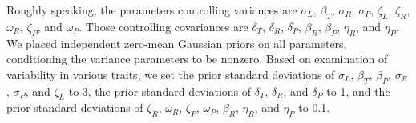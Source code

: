 \documentclass{article}
\begin{document}
Roughly speaking, the parameters controlling variances are 
$\sigma_L$, $\beta_T$, $\sigma_R$, $\sigma_P$, $\zeta_L$, $\zeta_R$, $\omega_R$, $\zeta_P$, and $\omega_P$.
Those controlling covariances are $\delta_T$, $\delta_R$, $\delta_P$, $\beta_R$, $\beta_P$, $\eta_R$, and $\eta_P$.
We placed independent zero-mean Gaussian priors on all parameters, conditioning the variance parameters to be nonzero.
Based on examination of variability in various traits, we set
the prior standard deviations of $\sigma_L$, $\beta_T$, $\beta_P$, $\sigma_R$, $\sigma_P$, and $\zeta_L$ to 3,
the prior standard deviations of $\delta_T$, $\delta_R$, and $\delta_P$ to 1,
and the prior standard deviations of $\zeta_R$, $\omega_R$, $\zeta_P$, $\omega_P$, $\beta_R$, $\eta_R$, and $\eta_P$ to 0.1.



\end{document}
